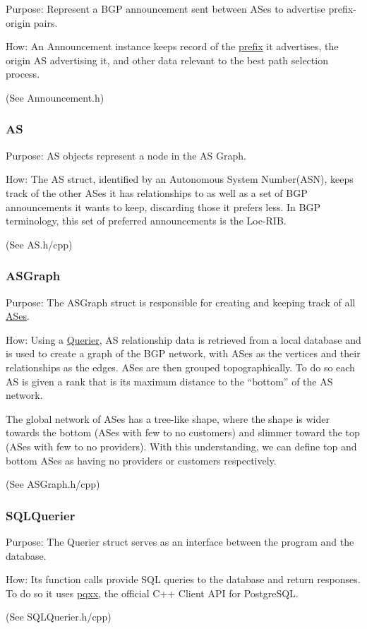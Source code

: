 \documentclass[letterpaper]{article}
\begin{document}
Purpose: Represent a BGP announcement sent between ASes to advertise
prefix-origin pairs.

How: An Announcement instance keeps record of the
\protect\hyperlink{Prefix}{prefix} it advertises, the origin AS
advertising it, and other data relevant to the best path selection
process.

(See Announcement.h)

\hypertarget{as}{%
\subsubsection{AS}\label{as}}

Purpose: AS objects represent a node in the AS Graph.

How: The AS struct, identified by an Autonomous System Number(ASN),
keeps track of the other ASes it has relationships to as well as a set
of BGP announcements it wants to keep, discarding those it prefers less.
In BGP terminology, this set of preferred announcements is the Loc-RIB.

(See AS.h/cpp)

\hypertarget{asgraph}{%
\subsubsection{ASGraph}\label{asgraph}}

Purpose: The ASGraph struct is responsible for creating and keeping
track of all \protect\hyperlink{AS}{ASes}.

How: Using a \protect\hyperlink{Querier}{Querier}, AS relationship data
is retrieved from a local database and is used to create a graph of the
BGP network, with ASes as the vertices and their relationships as the
edges. ASes are then grouped topographically. To do so each AS is given
a rank that is its maximum distance to the ``bottom'' of the AS network.

The global network of ASes has a tree-like shape, where the shape is
wider towards the bottom (ASes with few to no customers) and slimmer
toward the top (ASes with few to no providers). With this understanding,
we can define top and bottom ASes as having no providers or customers
respectively.

(See ASGraph.h/cpp)

\hypertarget{sqlquerier}{%
\subsubsection{SQLQuerier}\label{sqlquerier}}

Purpose: The Querier struct serves as an interface between the program
and the database.

How: Its function calls provide SQL queries to the database and return
responses. To do so it uses \href{https://github.com/jtv/libpqxx}{pqxx},
the official C++ Client API for PostgreSQL.

(See SQLQuerier.h/cpp)


\nocite{*}

\end{document}
